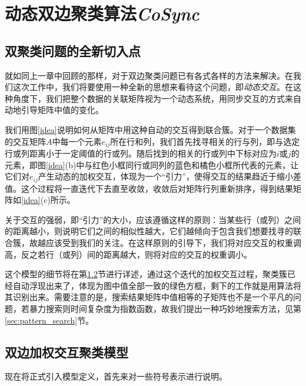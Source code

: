 
\chapter{动态双边聚类算法\emph{CoSync}}
\label{chapter:main}
\section{双聚类问题的全新切入点}
\label{sec:start}
就如同上一章中回顾的那样，对于双边聚类问题已有各式各样的方法来解决。在我们这次工作中，我们将要使用一种全新的思想来看待这个问题，即\emph{动态交互}。在这种角度下，我们把整个数据的关联矩阵视为一个动态系统，用同步交互的方式来自动地引导矩阵中值的变化。

我们用图\ref{idea}说明如何从矩阵中用这种自动的交互得到联合簇。对于一个数据集的交互矩阵$A$中每一个元素$e_{ij}$所在行和列，我们首先找寻相关的行与列，即与选定行或列距离小于一定阈值的行或列。随后找到的相关的行或列中下标对应为$i$或$j$的元素，即图\ref{idea}(b)中与红色小框同行或同列的蓝色和橘色小框所代表的元素，让它们对$e_{ij}$产生动态的加权交互，体现为一个“引力”，使得交互的结果趋近于缩小差值。这个过程将一直迭代下去直至收敛，收敛后对矩阵行列重新排序，得到结果矩阵如\ref{idea}(c)所示。


关于交互的强弱，即“引力”的大小，应该遵循这样的原则：当某些行（或列）之间的距离越小，则说明它们之间的相似性越大，它们越倾向于包含我们想要找寻的联合簇，故越应该受到我们的关注。在这样原则的引导下，我们将对应交互的权重调高，反之若行（或列）间的距离越大，则将对应的交互的权重调小。

这个模型的细节将在第\ref{sec:main}节进行详述，通过这个迭代的加权交互过程，聚类簇已经自动浮现出来了，体现为图中值全部一致的绿色方框，剩下的工作就是用算法将其识别出来。需要注意的是，搜索结果矩阵中值相等的子矩阵也不是一个平凡的问题，若暴力搜索则时间复杂度为指数函数，故我们提出一种巧妙地搜索方法，见第\ref{sec:pattern_search}节。


\section{双边加权交互聚类模型}
\label{sec:main}
现在将正式引入模型定义，首先来对一些符号表示进行说明。


